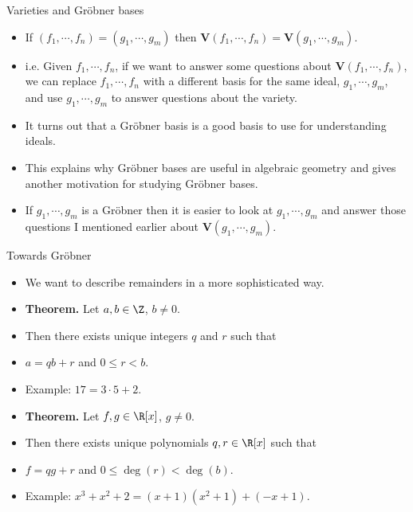 \documentclass{beamer}
\begin{document}

\begin{frame}{Varieties and Gr\"{o}bner bases}

\begin{itemize}
  \item If $(f_1,\cdots,f_n) = (g_1,\cdots,g_m)$ then $\mathbf{V}(f_1,\cdots,f_n) = \mathbf{V}(g_1,\cdots,g_m)$.
  \item i.e. Given $f_1,\cdots,f_n$, if we want to answer some questions about $\mathbf{V}(f_1,\cdots,f_n)$,
  we can replace $f_1,\cdots,f_n$ with a different basis for the same ideal, $g_1,\cdots,g_m$, and use
  $g_1,\cdots,g_m$ to answer questions about the variety.
  \item It turns out that a Gr\"{o}bner basis is a good basis to use for understanding ideals.
  \item This explains why Gr\"{o}bner bases are useful in algebraic geometry and gives another motivation for studying Gr\"{o}bner bases.
  \item If $g_1,\cdots,g_m$ is a Gr\"{o}bner then it is easier to look at $g_1,\cdots,g_m$ and answer those questions I mentioned earlier
  about $\mathbf{V}(g_1,\cdots,g_m)$.

\end{itemize}
\end{frame}



\begin{frame}{Towards Gr\"{o}bner}

\begin{itemize}
  \item We want to describe remainders in a more sophisticated way.
  \item \textbf{Theorem.} Let $a,b\in\Z$, $b\not=0$.
  \item Then there exists unique integers $q$ and $r$ such that
  \item $a = qb +r$ and $0\leq r < b$.
  \item Example: $17 = 3 \cdot 5 + 2$.
  \item \textbf{Theorem.} Let $f,g\in\R[x]$, $g\not=0$.
  \item Then there exists unique polynomials $q,r\in\R[x]$ such that
  \item $f = qg +r$ and $0\leq \deg(r) < \deg(b)$.
  \item Example: $x^3 + x^2 + 2 = (x+1)(x^2+1) + ( -x + 1)$.
\end{itemize}
\end{frame}
\end{document}
